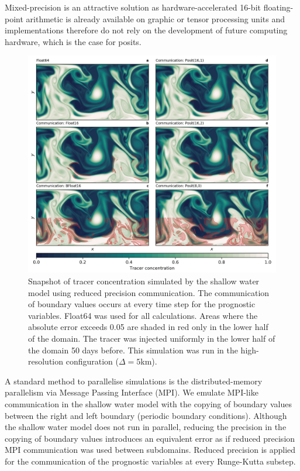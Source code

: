 Mixed-precision is an attractive solution as hardware-accelerated 16-bit
floating-point arithmetic is already available on graphic or tensor processing
units and implementations therefore do not rely on the development of future
computing hardware, which is the case for posits.

\begin{figure}
\includegraphics[width=1\textwidth]{Figures/swm/snapshot_comm.png}
\caption{Snapshot of tracer concentration simulated by the shallow water model
using reduced precision communication. The communication of boundary values occurs
at every time step for the prognostic variables. Float64 was used for all calculations.
Areas where the absolute error exceeds 0.05 are shaded in red only in the lower
half of the domain. The tracer was injected uniformly in the lower half of the
domain 50 days before. This simulation was run in the high-resolution
configuration ($\Delta = 5$km).}
\label{fig:snapshot_comm}
\end{figure}

A standard method to parallelise simulations is the distributed-memory parallelism
via Message Passing Interface (MPI). We emulate MPI-like communication in the
shallow water model with the copying of boundary values between the right and
left boundary (periodic boundary conditions). Although the shallow water model
does not run in parallel, reducing the precision in the copying of boundary values
introduces an equivalent error as if reduced precision MPI communication was used
between subdomains. Reduced precision is applied for the communication of the
prognostic variables at every Runge-Kutta substep.


